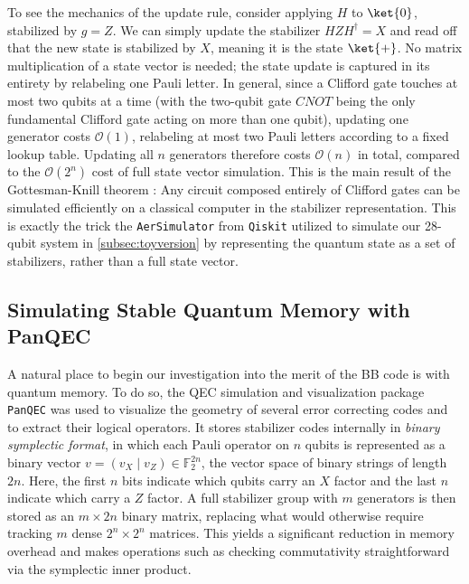 To see the mechanics of the update rule, consider applying $H$ to $\ket{0}$, stabilized by $g = Z$. We can simply update the stabilizer $HZH^\dagger = X$ and read off that the new state is stabilized by $X$, meaning it is the state $\ket{+}$. No matrix multiplication of a state vector is needed; the state update is captured in its entirety by relabeling one Pauli letter. In general, since a Clifford gate touches at most two qubits at a time (with the two-qubit gate $CNOT$ being the only fundamental Clifford gate acting on more than one qubit), updating one generator costs $\mathcal{O}(1)$, relabeling at most two Pauli letters according to a fixed lookup table. Updating all $n$ generators therefore costs $\mathcal{O}(n)$ in total, compared to the $\mathcal{O}(2^n)$ cost of full state vector simulation. This is the main result of the Gottesman-Knill theorem \cite{gottesman1998heisenbergrepresentationquantumcomputers}: Any circuit composed entirely of Clifford gates can be simulated efficiently on a classical computer in the stabilizer representation. This is exactly the trick the \texttt{AerSimulator} from \texttt{Qiskit} utilized to simulate our 28-qubit system in \cref{subsec:toyversion} by representing the quantum state as a set of stabilizers, rather than a full state vector.

\subsection{Simulating Stable Quantum Memory with PanQEC}\label{subsec:panqec_memory}
A natural place to begin our investigation into the merit of the BB code is with quantum memory. To do so, the QEC simulation and visualization package \texttt{PanQEC} \cite{panqec2021} was used to visualize the geometry of several error correcting codes and to extract their logical operators. It stores stabilizer codes internally in \emph{binary symplectic format}, in which each Pauli operator on $n$ qubits is represented as a binary vector $v = (v_X \mid v_Z) \in \mathbb{F}_2^{2n}$, the vector space of binary strings of length $2n$. Here, the first $n$ bits indicate which qubits carry an $X$ factor and the last $n$ indicate which carry a $Z$ factor. A full stabilizer group with $m$ generators is then stored as an $m \times 2n$ binary matrix, replacing what would otherwise require tracking $m$ dense $2^n \times 2^n$ matrices. This yields a significant reduction in memory overhead and makes operations such as checking commutativity straightforward via the symplectic inner product.

